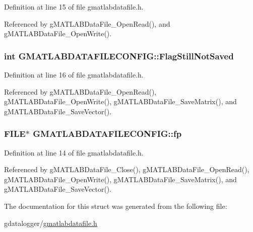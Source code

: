 Definition at line 15 of file gmatlabdatafile.\-h.



Referenced by g\-M\-A\-T\-L\-A\-B\-Data\-File\-\_\-\-Open\-Read(), and g\-M\-A\-T\-L\-A\-B\-Data\-File\-\_\-\-Open\-Write().

\hypertarget{structGMATLABDATAFILECONFIG_a58d1c2a70b22c7c08eccaaea77990db2}{
\subsubsection[{Flag\-Still\-Not\-Saved}]{\setlength{\rightskip}{0pt plus 5cm}int G\-M\-A\-T\-L\-A\-B\-D\-A\-T\-A\-F\-I\-L\-E\-C\-O\-N\-F\-I\-G\-::\-Flag\-Still\-Not\-Saved}}\label{structGMATLABDATAFILECONFIG_a58d1c2a70b22c7c08eccaaea77990db2}


Definition at line 16 of file gmatlabdatafile.\-h.



Referenced by g\-M\-A\-T\-L\-A\-B\-Data\-File\-\_\-\-Open\-Read(), g\-M\-A\-T\-L\-A\-B\-Data\-File\-\_\-\-Open\-Write(), g\-M\-A\-T\-L\-A\-B\-Data\-File\-\_\-\-Save\-Matrix(), and g\-M\-A\-T\-L\-A\-B\-Data\-File\-\_\-\-Save\-Vector().

\hypertarget{structGMATLABDATAFILECONFIG_a900bde88d01e7b5380101446c89a06a6}{
\subsubsection[{fp}]{\setlength{\rightskip}{0pt plus 5cm}F\-I\-L\-E$\ast$ G\-M\-A\-T\-L\-A\-B\-D\-A\-T\-A\-F\-I\-L\-E\-C\-O\-N\-F\-I\-G\-::fp}}\label{structGMATLABDATAFILECONFIG_a900bde88d01e7b5380101446c89a06a6}


Definition at line 14 of file gmatlabdatafile.\-h.



Referenced by g\-M\-A\-T\-L\-A\-B\-Data\-File\-\_\-\-Close(), g\-M\-A\-T\-L\-A\-B\-Data\-File\-\_\-\-Open\-Read(), g\-M\-A\-T\-L\-A\-B\-Data\-File\-\_\-\-Open\-Write(), g\-M\-A\-T\-L\-A\-B\-Data\-File\-\_\-\-Save\-Matrix(), and g\-M\-A\-T\-L\-A\-B\-Data\-File\-\_\-\-Save\-Vector().



The documentation for this struct was generated from the following file\-:\begin{DoxyCompactItemize}
\item 
gdatalogger/\hyperlink{gmatlabdatafile_8h}{gmatlabdatafile.\-h}\end{DoxyCompactItemize}
